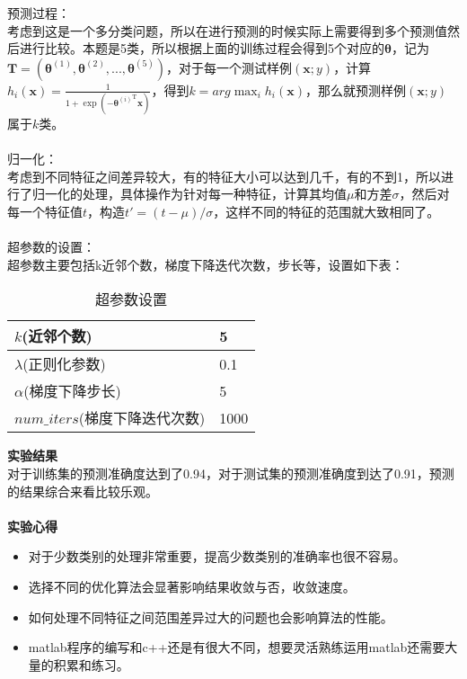 \documentclass[a4paper,UTF8]{article}
\numberwithin{equation}{section}
\begin{document}
预测过程：\\
考虑到这是一个多分类问题，所以在进行预测的时候实际上需要得到多个预测值然后进行比较。本题是5类，所以根据上面的训练过程会得到5个对应的$\boldsymbol{\theta}$，记为$\mathbf{T} = (\boldsymbol{\theta}^{(1)}, \boldsymbol{\theta}^{(2)}, ..., \boldsymbol{\theta}^{(5)})$，对于每一个测试样例$(\mathbf{x}; y)$，计算$h_i(\mathbf{x}) = \frac{1}{1 + \exp(-{\boldsymbol{\theta}^{(i)}}^\mathrm{T}\mathbf{x})}$，得到$k=arg \max_i h_i(\mathbf{x})$，那么就预测样例$(\mathbf{x}; y)$属于$k$类。\\\\
归一化：\\
考虑到不同特征之间差异较大，有的特征大小可以达到几千，有的不到1，所以进行了归一化的处理，具体操作为针对每一种特征，计算其均值$\mu$和方差$\sigma$，然后对每一个特征值$t$，构造$t' = (t-\mu)/\sigma$，这样不同的特征的范围就大致相同了。\\\\
超参数的设置：\\
超参数主要包括k近邻个数，梯度下降迭代次数，步长等，设置如下表：
\begin{table}[!htbp]
	\centering
	\caption{超参数设置}
	\label{my-label}
	\begin{tabular}{|l|l|}
		\hline
		$k$(近邻个数)          & 5    \\ \hline
		$\lambda$(正则化参数)    & 0.1  \\ \hline
		$\alpha$(梯度下降步长)     & 5    \\ \hline
		$num\_iters$(梯度下降迭代次数) & 1000 \\ \hline
	\end{tabular}
\end{table}

\noindent\textbf{实验结果}\\
对于训练集的预测准确度达到了0.94，对于测试集的预测准确度到达了0.91，预测的结果综合来看比较乐观。\\\\

\noindent\textbf{实验心得}\\
\begin{itemize}
\item 对于少数类别的处理非常重要，提高少数类别的准确率也很不容易。
\item 选择不同的优化算法会显著影响结果收敛与否，收敛速度。 
\item 如何处理不同特征之间范围差异过大的问题也会影响算法的性能。
\item matlab程序的编写和c++还是有很大不同，想要灵活熟练运用matlab还需要大量的积累和练习。
\end{itemize}
\end{document}
